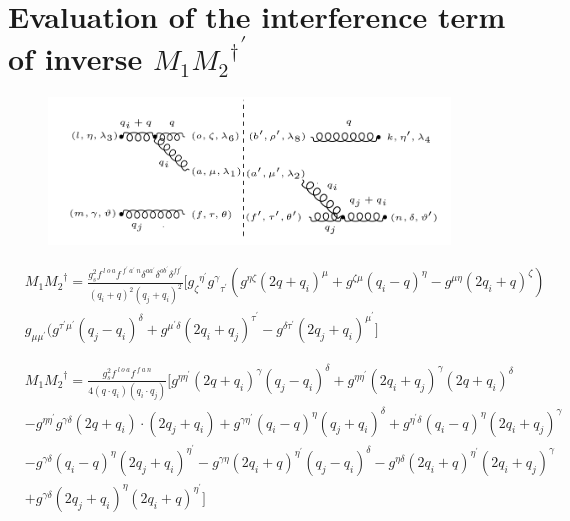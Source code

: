 \section*{Evaluation of the interference term of inverse ${M_1{M_2}^{\dagger}}^{\prime}$}

\label{EvaIntInvGG}
\begin{figure}[h!]
\centering
\includegraphics[width=0.95\textwidth]{images/GG/M1DaggerggInverse.png}
\end{figure}


\begin{equation}
\begin{split}
&M_1{M_2}^{\dagger}=\frac{g_s^2 f^{\:l\:o\:a} f^{\:f^{\prime}\: a^{\prime}\:n} \delta^{aa^{\prime}} \delta^{ob^{\prime}} \delta^{ff^{\prime}}}{(q_i +q)^2 (q_j +q_i)^2}
[{g_{{\zeta}}}^{{\eta}^{\prime}} {g^{\gamma}}_{{\tau}^{\prime}}(g^{{\eta}{\zeta}}(2q+q_i)^{\mu}+g^{{\zeta}{\mu}}(q_i -q)^{\eta}-g^{{\mu}{\eta}}(2q_i +q)^{\zeta})\\
&g_{{{\mu}}{{\mu}^{\prime}}}(g^{{{\tau}^{\prime}}{{\mu}^{\prime}}}(q_j-q_i)^{{\delta}}+g^{{{\mu}^{\prime}}{{\delta}}}(2q_i +q_j)^{{\tau}^{\prime}}-g^{{{\delta}}{{\tau}^{\prime}}}(2q_j+q_i)^{{\mu}^{\prime}}]
\end{split}
\end{equation}


\begin{equation}
\begin{split}
&M_1{M_2}^{\dagger}=\frac{g_s^2 f^{\:l\:o\:a} f^{\:f\: a\:n}}{4(q\cdot q_i) (q_i \cdot q_j)}[g^{{{\eta}}{{\eta}^{\prime}}}(2q+q_i)^{\gamma}(q_j-q_i)^{{\delta}}+g^{{{\eta}}{{\eta}^{\prime}}}(2q_i +q_j)^{\gamma}(2q+q_i)^{{\delta}}\\
&-g^{{{\eta}}{{\eta}^{\prime}}}g^{{{\gamma}}{{\delta}}}(2q+q_i)\cdot (2q_j+q_i)+g^{{{\gamma}}{{\eta}^{\prime}}}(q_i -q)^{\eta}(q_j+q_i)^{{\delta}}+g^{{{\eta}^{\prime}}{{\delta}}}(q_i -q)^{\eta}(2q_i +q_j)^{{\gamma}}
\\
&-g^{{{\gamma}}{{\delta}}}(q_i -q)^{\eta}(2q_j+q_i)^{{\eta}^{\prime}}-g^{{{\gamma}}{{\eta}}}(2q_i +q)^{{\eta}^{\prime}}(q_j-q_i)^{{\delta}}
-g^{{{\eta}}{{\delta}}}(2q_i +q)^{{\eta}^{\prime}}(2q_i +q_j)^{{\gamma}}\\
&
+g^{{{\gamma}}{{\delta}}}(2q_j+q_i)^{{\eta}}(2q_i +q)^{{\eta}^{\prime}}]\\
\end{split}
\end{equation}

